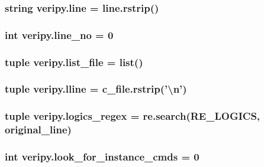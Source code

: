 \hypertarget{namespaceveripy_a3cf9cf94513841f0d65d3081b08a55cc}{
\subsubsection[{line}]{\setlength{\rightskip}{0pt plus 5cm}string veripy.\-line = line.\-rstrip()}}\label{namespaceveripy_a3cf9cf94513841f0d65d3081b08a55cc}
\hypertarget{namespaceveripy_a3a1edb61e3fbeca505c17ea042672337}{
\subsubsection[{line\-\_\-no}]{\setlength{\rightskip}{0pt plus 5cm}int veripy.\-line\-\_\-no = 0}}\label{namespaceveripy_a3a1edb61e3fbeca505c17ea042672337}
\hypertarget{namespaceveripy_a19f042b78eb1792546d8fa9c3bf497c0}{
\subsubsection[{list\-\_\-file}]{\setlength{\rightskip}{0pt plus 5cm}tuple veripy.\-list\-\_\-file = list()}}\label{namespaceveripy_a19f042b78eb1792546d8fa9c3bf497c0}
\hypertarget{namespaceveripy_a6f22577aabdde3d295a3441ce0537364}{
\subsubsection[{lline}]{\setlength{\rightskip}{0pt plus 5cm}tuple veripy.\-lline = c\-\_\-file.\-rstrip('\textbackslash{}n')}}\label{namespaceveripy_a6f22577aabdde3d295a3441ce0537364}
\hypertarget{namespaceveripy_ae0b7b329f168ad945a5a19f369c6c1a3}{
\subsubsection[{logics\-\_\-regex}]{\setlength{\rightskip}{0pt plus 5cm}tuple veripy.\-logics\-\_\-regex = re.\-search(R\-E\-\_\-\-L\-O\-G\-I\-C\-S, {\bf original\-\_\-line})}}\label{namespaceveripy_ae0b7b329f168ad945a5a19f369c6c1a3}
\hypertarget{namespaceveripy_a9592e23a9639a28b61167a30ba6930c3}{
\subsubsection[{look\-\_\-for\-\_\-instance\-\_\-cmds}]{\setlength{\rightskip}{0pt plus 5cm}int veripy.\-look\-\_\-for\-\_\-instance\-\_\-cmds = 0}}\label{namespaceveripy_a9592e23a9639a28b61167a30ba6930c3}
